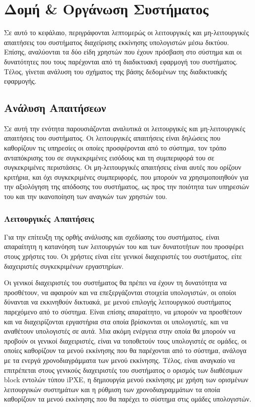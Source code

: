 \chapter{Δομή \& Οργάνωση Συστήματος}
Σε αυτό το κεφάλαιο, περιγράφονται λεπτομερώς οι λειτουργικές και μη-λειτουργικές απαιτήσεις του συστήματος διαχείρισης εκκίνησης υπολογιστών μέσω δικτύου. Επίσης, αναλύονται τα δύο είδη χρηστών που έχουν πρόσβαση στο σύστημα και οι δυνατότητες που τους παρέχονται από τη διαδικτυακή εφαρμογή του συστήματος. Τέλος, γίνεται ανάλυση του σχήματος της βάσης δεδομένων της διαδικτυακής εφαρμογής.

\section{Ανάλυση Απαιτήσεων}
Σε αυτή την ενότητα παρουσιάζονται αναλυτικά οι λειτουργικές και μη-λειτουργικές απαιτήσεις του συστήματος. Οι λειτουργικές απαιτήσεις είναι δηλώσεις που καθορίζουν τις υπηρεσίες οι οποίες προσφέρονται από το σύστημα, τον τρόπο ανταπόκρισης του σε συγκεκριμένες εισόδους και τη συμπεριφορά του σε συγκεκριμένες περιστάσεις. Οι μη-λειτουργικές απαιτήσεις είναι αυτές που ορίζουν κριτήρια, και όχι συγκεκριμένες συμπεριφορές, που μπορούν να χρησιμοποιηθούν για την αξιολόγηση της απόδοσης του συστήματος, ως προς την ποιότητα των υπηρεσιών του και την ικανοποίηση των αναγκών των χρηστών του.

\subsection{Λειτουργικές Απαιτήσεις}
Για την επίτευξη της ορθής ανάλυσης και σχεδίασης του συστήματος, είναι απαραίτητη η κατανόηση των λειτουργιών του και των δυνατοτήτων που προσφέρει στους χρήστες του. Οι χρήστες είναι είτε γενικοί διαχειριστές του συστήματος, είτε διαχειριστές συγκεκριμένων εργαστηρίων.

Οι γενικοί διαχειριστές του συστήματος θα πρέπει να έχουν τη δυνατότητα να προσθέτουν, να αφαιρούν και να επεξεργάζονται στοιχεία υπολογιστών, οι οποίοι δύνανται να εκκινηθούν δικτυακά, με μενού επιλογής λειτουργικού συστήματος παρεχόμενο από το σύστημα. Είναι επίσης απαραίτητο, να μπορούν να προσθέτουν και να διαχειρίζονται εργαστήρια στα οποία βρίσκονται οι υπολογιστές, και να αναθέτουν υπολογιστές σε αυτά. Μια ακόμη ενέργεια στην οποία θα μπορούν να προβούν οι γενικοί διαχειριστές, είναι να τοποθετούν τους υπολογιστές σε ομάδες, οι οποίες καθορίζουν τα μενού εκκίνησης που θα παρέχονται από το σύστημα, ανάλογα με τα ενεργά χρονοδιαγράμματα των μενού εκκίνησης. Τέλος, είναι αναγκαίο να επιτρέπεται στους γενικούς διαχειριστές του συστήματος ο ορισμός των διαθέσιμων block εντολών τύπου iPXE, η δημιουργία μενού εκκίνησης με χρήση των ορισμένων λειτουργικών συστημάτων και η ρύθμιση των χρονοδιαγραμμάτων τα οποία καθορίζουν τα μενού εκκίνησης που θα παρέχει το σύστημα στις ομάδες υπολογιστών.

